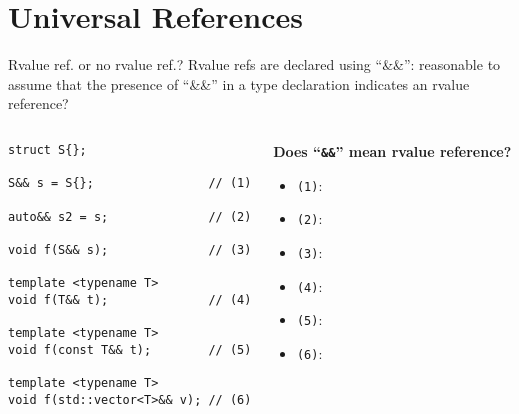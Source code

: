 \section{Universal References}

\begin{frame}[fragile]{Rvalue ref. or no rvalue ref.?}
    Rvalue refs are declared using \enquote{\&\&}: reasonable to assume that the presence of \enquote{\&\&} in a type declaration indicates an rvalue reference?
    \begin{columns}
        \begin{column}{.45\textwidth}
            \begin{lstlisting}[numbers=none]
struct S{};

S&& s = S{};                // (1)

auto&& s2 = s;              // (2)

void f(S&& s);              // (3)

template <typename T>
void f(T&& t);              // (4)

template <typename T>
void f(const T&& t);        // (5)

template <typename T>
void f(std::vector<T>&& v); // (6)
            \end{lstlisting}
        \end{column}
        \begin{column}{.5\textwidth}
            \textbf{Does \enquote{\texttt{\&\&}} mean rvalue reference?}
            \begin{itemize}
                \item \texttt{(1)}: \only<1>{???}
                \item \texttt{(2)}: 
                \item \texttt{(3)}: 
                \item \texttt{(4)}: 
                \item \texttt{(5)}: \only<2>{yes}
                \item \texttt{(6)}: 
            \end{itemize}
        \end{column}
    \end{columns}
\end{frame}


